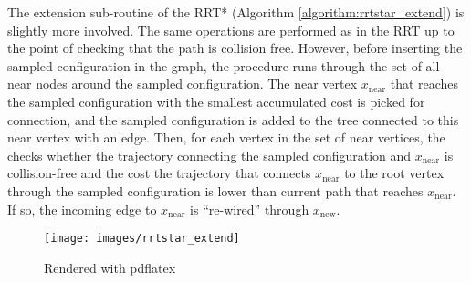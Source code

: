 \documentclass{article}
\begin{document}


The extension sub-routine of the RRT* (Algorithm \ref{algorithm:rrtstar_extend}) is slightly more involved. 
%
The same operations are performed as in the RRT up to the point of checking that the path is collision free. 
%
However, before inserting the sampled configuration in the graph, the procedure runs through the set of all near nodes around the sampled configuration. The near vertex $x_\mathrm{near}$ that reaches the sampled configuration with the smallest accumulated cost is picked for connection, and the sampled configuration is added to the tree connected to this near vertex with an edge. 
%
Then, for each vertex in the set of near vertices, the checks whether the trajectory connecting the sampled configuration and $x_\mathrm{near}$ is collision-free and the cost the trajectory that connects $x_\mathrm{near}$ to the root vertex through the sampled configuration is lower than current path that reaches $x_\mathrm{near}$.
%
If so, the incoming edge to $x_\mathrm{near}$ is ``re-wired'' through $x_\mathrm{new}$.

\begin{figure}[h]
    \centering
    \texttt{[image: images/rrtstar\_extend]}
    \caption{Rendered with pdflatex}
\end{figure}


\end{document}
